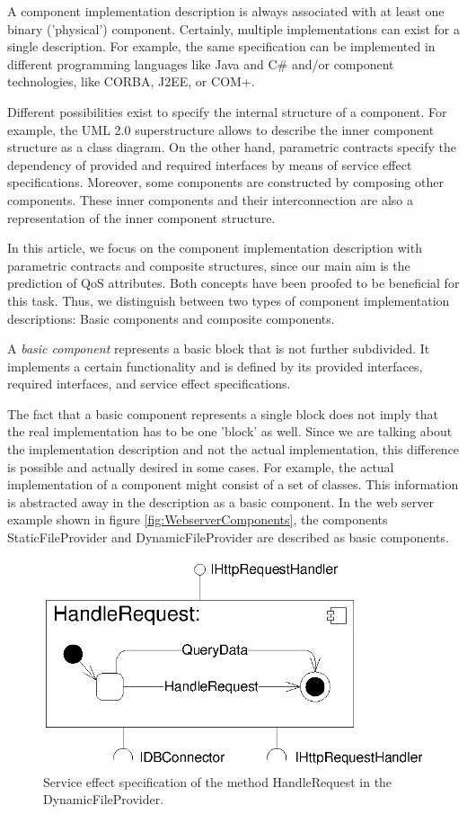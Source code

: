 A component implementation description is always associated with at least
one binary ('physical') component. Certainly, multiple implementations
can exist for a single description. For example, the same
specification can be implemented in different programming languages like Java
and C\# and/or component technologies, like CORBA, J2EE, or COM+. 

Different possibilities exist to specify the internal structure of a
component. For example, the UML 2.0 superstructure \cite{OMGUML2005a} allows to
describe the inner component structure as a class diagram.
On the other hand, parametric contracts specify the dependency of provided
and required interfaces by means of service effect specifications.
Moreover, some components are constructed by composing other components. These
inner components and their interconnection are also a representation of the
inner component structure.

In this article, we focus on the component implementation description with
parametric contracts and composite structures, since our main aim is the
prediction of QoS attributes. Both concepts have been proofed to be beneficial
for this task. Thus, we distinguish between two types of component
implementation descriptions: Basic components and composite components.

A \emph{basic component} represents a basic block that is not further
subdivided. It implements a certain functionality and is defined by its provided
interfaces, required interfaces, and service effect specifications.

The fact that a basic component represents a single block does not imply that
the real implementation has to be one 'block' as well. Since we are talking
about the implementation description and not the actual implementation, this
difference is possible and actually desired in some cases. For example, the
actual implementation of a component might consist of a set of classes. This
information is abstracted away in the description as a basic component. In
the web server example shown in figure \ref{fig:WebserverComponents}, the
components StaticFileProvider and DynamicFileProvider are described as basic
components.

\begin{figure}[htbp]
\centering
\includegraphics[scale=0.85]{example/HandleRequestSEFF}
\caption{Service effect specification of the method HandleRequest in the
DynamicFileProvider.}
\label{fig:seff}
\end{figure}

